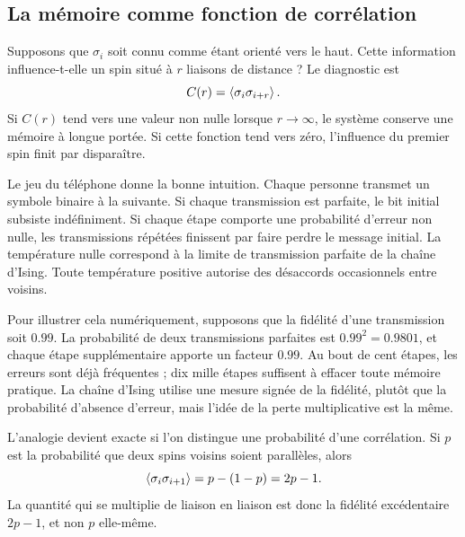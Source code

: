 \begin{classroomqa}\end{classroomqa}

\subsection{La mémoire comme fonction de corrélation}

Supposons que \(\sigma_i\) soit connu comme étant orienté vers le haut. Cette information influence-t-elle un spin situé à \(r\) liaisons de distance ? Le diagnostic est
\begin{equation}
C(r)=\left\langle\sigma_i\sigma_{i+r}\right\rangle.
\end{equation}
Si \(C(r)\) tend vers une valeur non nulle lorsque \(r\to\infty\), le système conserve une mémoire à longue portée. Si cette fonction tend vers zéro, l’influence du premier spin finit par disparaître.

Le jeu du téléphone donne la bonne intuition. Chaque personne transmet un symbole binaire à la suivante. Si chaque transmission est parfaite, le bit initial subsiste indéfiniment. Si chaque étape comporte une probabilité d’erreur non nulle, les transmissions répétées finissent par faire perdre le message initial. La température nulle correspond à la limite de transmission parfaite de la chaîne d’Ising. Toute température positive autorise des désaccords occasionnels entre voisins.

Pour illustrer cela numériquement, supposons que la fidélité d’une transmission soit \(0.99\). La probabilité de deux transmissions parfaites est \(0.99^2=0.9801\), et chaque étape supplémentaire apporte un facteur \(0.99\). Au bout de cent étapes, les erreurs sont déjà fréquentes ; dix mille étapes suffisent à effacer toute mémoire pratique. La chaîne d’Ising utilise une mesure signée de la fidélité, plutôt que la probabilité d’absence d’erreur, mais l’idée de la perte multiplicative est la même.

L’analogie devient exacte si l’on distingue une probabilité d’une corrélation. Si \(p\) est la probabilité que deux spins voisins soient parallèles, alors
\begin{equation}
\left\langle\sigma_i\sigma_{i+1}\right\rangle
=p-(1-p)=2p-1.
\end{equation}
La quantité qui se multiplie de liaison en liaison est donc la fidélité excédentaire \(2p-1\), et non \(p\) elle-même.

